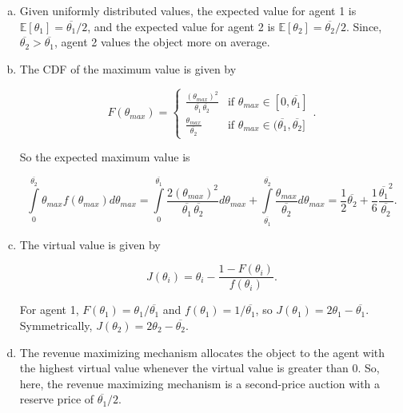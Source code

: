 \documentclass{article}
\begin{document}
\begin{enumerate}[(a)]

	\item

	Given uniformly distributed values, the expected value for agent 1 is $\mathbb{E}[\theta_1] = \overline{\theta_1}/2$, and the expected value for agent 2 is $\mathbb{E}[\theta_2] = \overline{\theta_2}/2$. Since, $\overline{\theta_2} > \overline{\theta_1}$, agent 2 values the object more on average.

	\item

	The CDF of the maximum value is given by

	\[
	 F(\theta_{max}) = 
	  \begin{cases} 
	   \frac{(\theta_{max})^2}{\overline{\theta_1} \, \overline{\theta_2}} & \text{if } \theta_{max} \in [0,\overline{\theta_1}]  \\
	   \frac{\theta_{max}}{\overline{\theta_2}} & \text{if } \theta_{max} \in (\overline{\theta_1}, \overline{\theta_2}]
	  \end{cases}.
	\]

	So the expected maximum value is

	$$\int \limits_0^{\overline{\theta_2}} \theta_{max} f(\theta_{max}) d\theta_{max} = \int \limits_0^{\overline{\theta_1}}  \frac{2(\theta_{max})^2}{\overline{\theta_1} \, \overline{\theta_2}} d\theta_{max} + \int \limits_{\overline{\theta_1}}^{\overline{\theta_2}} \frac{\theta_{max}}{\overline{\theta_2}} d\theta_{max} = \frac{1}{2} \overline{\theta_2} + \frac{1}{6} \frac{\overline{\theta_1}^2}{\overline{\theta_2}}.$$

	\item

	The virtual value is given by

	$$J(\theta_i) = \theta_i - \frac{1 - F(\theta_i)}{f(\theta_i)}.$$

	For agent 1, $F(\theta_1) = \theta_1 / \overline{\theta_1}$ and $f(\theta_1) = 1 / \overline{\theta_1}$, so $J(\theta_1) = 2\theta_1 - \overline{\theta_1}.$ Symmetrically, $J(\theta_2) = 2\theta_2 - \overline{\theta_2}.$

	\item

	The revenue maximizing mechanism allocates the object to the agent with the highest virtual value whenever the virtual value is greater than 0. So, here, the revenue maximizing mechanism is a second-price auction with a reserve price of $\overline{\theta_1}/2$.


\end{enumerate}
\end{document}
